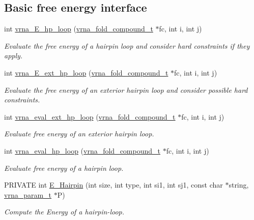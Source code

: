 \subsection*{Basic free energy interface}
\begin{DoxyCompactItemize}
\item 
int \mbox{\hyperlink{group__eval__loops__hp_ga57179ea326cc5ed8dfe4d3962b233128}{vrna\+\_\+\+E\+\_\+hp\+\_\+loop}} (\mbox{\hyperlink{group__fold__compound_ga1b0cef17fd40466cef5968eaeeff6166}{vrna\+\_\+fold\+\_\+compound\+\_\+t}} $\ast$fc, int i, int j)
\begin{DoxyCompactList}\small\item\em Evaluate the free energy of a hairpin loop and consider hard constraints if they apply. \end{DoxyCompactList}\item 
int \mbox{\hyperlink{group__eval__loops__hp_ga7d358fa17aaf1cfc312a053accd10778}{vrna\+\_\+\+E\+\_\+ext\+\_\+hp\+\_\+loop}} (\mbox{\hyperlink{group__fold__compound_ga1b0cef17fd40466cef5968eaeeff6166}{vrna\+\_\+fold\+\_\+compound\+\_\+t}} $\ast$fc, int i, int j)
\begin{DoxyCompactList}\small\item\em Evaluate the free energy of an exterior hairpin loop and consider possible hard constraints. \end{DoxyCompactList}\item 
\mbox{\label{group__eval__loops__hp_gafd39e7355dcf36bf1517bafc1b49c2d2}} 
int \mbox{\hyperlink{group__eval__loops__hp_gafd39e7355dcf36bf1517bafc1b49c2d2}{vrna\+\_\+eval\+\_\+ext\+\_\+hp\+\_\+loop}} (\mbox{\hyperlink{group__fold__compound_ga1b0cef17fd40466cef5968eaeeff6166}{vrna\+\_\+fold\+\_\+compound\+\_\+t}} $\ast$fc, int i, int j)
\begin{DoxyCompactList}\small\item\em Evaluate free energy of an exterior hairpin loop. \end{DoxyCompactList}\item 
int \mbox{\hyperlink{group__eval__loops__hp_gad0bb844f8dc704c71737ae1d7e32b975}{vrna\+\_\+eval\+\_\+hp\+\_\+loop}} (\mbox{\hyperlink{group__fold__compound_ga1b0cef17fd40466cef5968eaeeff6166}{vrna\+\_\+fold\+\_\+compound\+\_\+t}} $\ast$fc, int i, int j)
\begin{DoxyCompactList}\small\item\em Evaluate free energy of a hairpin loop. \end{DoxyCompactList}\item 
P\+R\+I\+V\+A\+TE int \mbox{\hyperlink{group__eval__loops__hp_gadf943ee9a45b7f4cee9192c06210dace}{E\+\_\+\+Hairpin}} (int size, int type, int si1, int sj1, const char $\ast$string, \mbox{\hyperlink{group__energy__parameters_ga8a69ca7d787e4fd6079914f5343a1f35}{vrna\+\_\+param\+\_\+t}} $\ast$P)
\begin{DoxyCompactList}\small\item\em Compute the Energy of a hairpin-\/loop. \end{DoxyCompactList}\end{DoxyCompactItemize}

